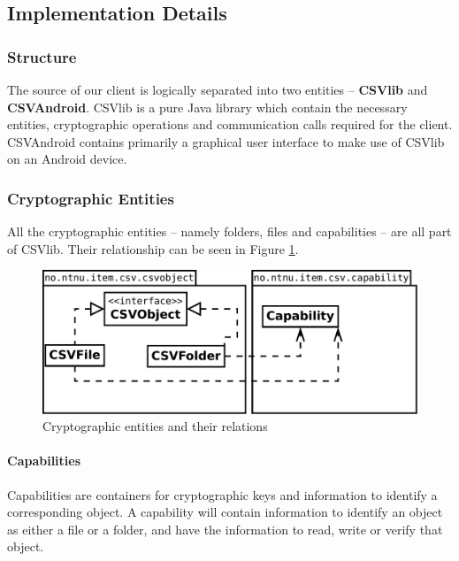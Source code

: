 \documentclass[pdftex,english,10pt,b5paper,twoside]{book}
\begin{document}
\subsection{Implementation Details}
\label{sec:cli:impl:det}

\subsubsection{Structure}

The source of our client is logically separated into two entities --
\textbf{CSVlib} and \textbf{CSVAndroid}. CSVlib is a pure Java library which
contain the necessary entities, cryptographic operations and communication
calls required for the client. CSVAndroid contains primarily a graphical user
interface to make use of CSVlib on an Android device.

\subsubsection{Cryptographic Entities}
\label{sec:cryptoentities}
All the cryptographic entities -- namely folders, files and capabilities -- are all
part of CSVlib. Their relationship can be seen in Figure \ref{fig:CSVlib:overview}.

\begin{figure}[h!]
    \centering
    \includegraphics[scale=0.4]{csvobjects.pdf}
    \caption{Cryptographic entities and their relations}
    \label{fig:CSVlib:overview}
\end{figure}

\paragraph{Capabilities} Capabilities are containers for
cryptographic keys and information to identify a corresponding object. A
capability will contain information to identify an object as either a file or a
folder, and have the information to read, write or verify that object.
\end{document}
